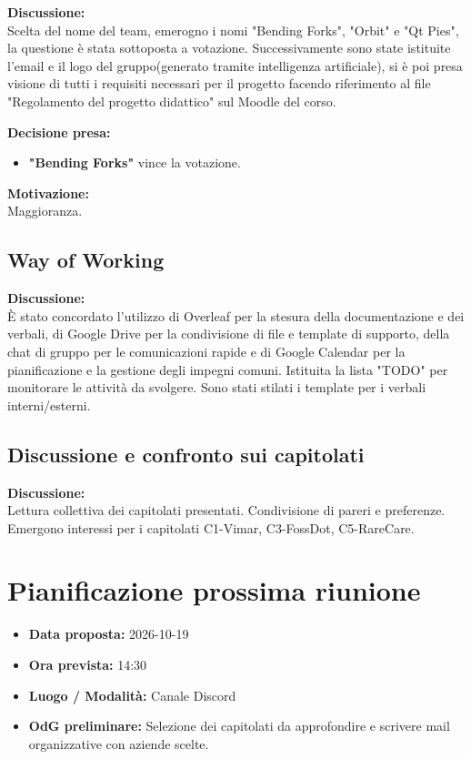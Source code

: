 \documentclass[12pt,a4paper]{article}
\newcommand{\tightlist}{\setlength{\itemsep}{1pt}\setlength{\parskip}{0pt}}
\begin{document}
\textbf{Discussione:} \\
{Scelta del nome del team, emerogno i nomi "Bending Forks", "Orbit" e "Qt Pies", la questione è stata sottoposta a votazione.
Successivamente sono state istituite l'email e il logo del gruppo(generato tramite intelligenza artificiale), si è poi presa visione di tutti i requisiti necessari per il progetto facendo riferimento al file "Regolamento del progetto didattico" sul Moodle del corso. }

\textbf{Decisione presa: }
\begin{itemize}
\tightlist
\item \textbf{"Bending Forks"}{ vince la votazione.}
\end{itemize}

\textbf{Motivazione:} \\
{ Maggioranza. }


\hypertarget{argomento-2}{%
\subsection{Way of Working}}

\textbf{Discussione:} \\
{È stato concordato l'utilizzo di Overleaf per la stesura della documentazione e dei verbali, di Google Drive per la condivisione di file e template di supporto, della chat di gruppo per le comunicazioni rapide e di Google Calendar per la pianificazione e la gestione degli impegni comuni. Istituita la lista "TODO" per monitorare le attività da svolgere. Sono stati stilati i template per i verbali interni/esterni.}


\hypertarget{varie-ed-eventuali}{%
\subsection{Discussione e confronto sui capitolati}}
\textbf{Discussione:} \\
{Lettura collettiva dei capitolati presentati. Condivisione di pareri e preferenze. Emergono interessi per i capitolati C1-Vimar, C3-FossDot, C5-RareCare.}

\hypertarget{prossima-riunione}{%
\section{Pianificazione prossima riunione}}

\begin{itemize}
\tightlist
\item \textbf{Data proposta:} 2026-10-19
\item \textbf{Ora prevista:} 14:30
\item \textbf{Luogo / Modalità:} Canale Discord 
\item \textbf{OdG preliminare:} {Selezione dei capitolati da approfondire e scrivere mail organizzative con aziende scelte. }
\end{itemize}
\end{document}
